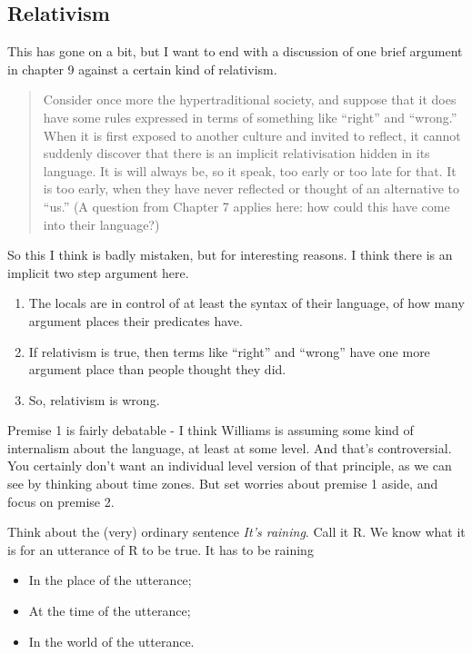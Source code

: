 \documentclass[
]{article}
\providecommand{\tightlist}{%
  \setlength{\itemsep}{0pt}\setlength{\parskip}{0pt}}
\begin{document}
\hypertarget{relativism}{%
\subsection{Relativism}\label{relativism}}

This has gone on a bit, but I want to end with a discussion of one brief
argument in chapter 9 against a certain kind of relativism.

\begin{quote}
Consider once more the hypertraditional society, and suppose that it
does have some rules expressed in terms of something like ``right'' and
``wrong.'' When it is first exposed to another culture and invited to
reflect, it cannot suddenly discover that there is an implicit
relativisation hidden in its language. It is will always be, so it
speak, too early or too late for that. It is too early, when they have
never reflected or thought of an alternative to ``us.'' (A question from
Chapter 7 applies here: how could this have come into their language?)
\end{quote}

So this I think is badly mistaken, but for interesting reasons. I think
there is an implicit two step argument here.

\begin{enumerate}
\def\labelenumi{\arabic{enumi}.}
\tightlist
\item
  The locals are in control of at least the syntax of their language, of
  how many argument places their predicates have.
\item
  If relativism is true, then terms like ``right'' and ``wrong'' have
  one more argument place than people thought they did.
\item
  So, relativism is wrong.
\end{enumerate}

Premise 1 is fairly debatable - I think Williams is assuming some kind
of internalism about the language, at least at some level. And that's
controversial. You certainly don't want an individual level version of
that principle, as we can see by thinking about time zones. But set
worries about premise 1 aside, and focus on premise 2.

Think about the (very) ordinary sentence \emph{It's raining}. Call it R.
We know what it is for an utterance of R to be true. It has to be
raining

\begin{itemize}
\tightlist
\item
  In the place of the utterance;
\item
  At the time of the utterance;
\item
  In the world of the utterance.
\end{itemize}
\end{document}
